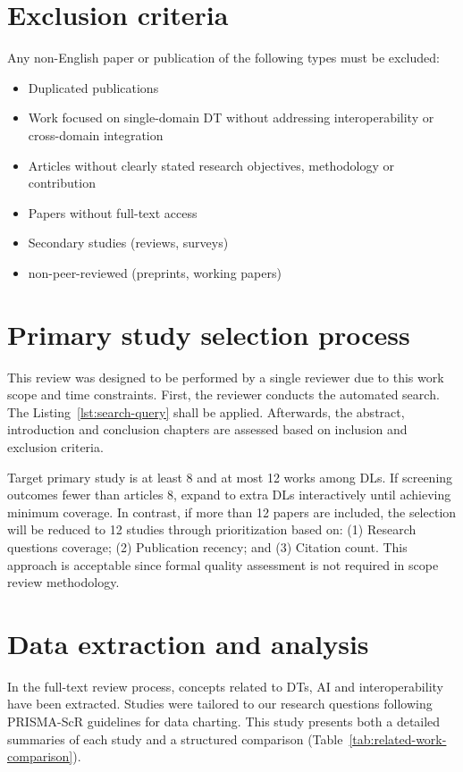 \section{Exclusion criteria}

Any non-English paper or publication of the following types must be excluded:

\begin{itemize}
    \item Duplicated publications
    \item Work focused on single-domain DT without addressing interoperability or cross-domain integration
    \item Articles without clearly stated research objectives, methodology or contribution
    \item Papers without full-text access
    \item Secondary studies (reviews, surveys)
    \item non-peer-reviewed (preprints, working papers)
\end{itemize}

\section{Primary study selection process}

This review was designed to be performed by a single reviewer due to this work scope and time constraints.
First, the reviewer conducts the automated search. The Listing~\ref{lst:search-query} shall be applied.
Afterwards, the abstract, introduction and conclusion chapters are assessed
    based on inclusion and exclusion criteria.

Target primary study is at least 8 and at most 12 works among DLs.
If screening outcomes fewer than articles 8, expand to extra DLs interactively until
    achieving minimum coverage.
In contrast, if more than 12 papers are included,
    the selection will be reduced to 12 studies through prioritization based on:
    (1) Research questions coverage;
    (2) Publication recency; and
    (3) Citation count.
This approach is acceptable since formal quality assessment is not
    required in scope review methodology.

\section{Data extraction and analysis}

In the full-text review process, concepts related to DTs, AI and interoperability have been extracted.
Studies were tailored to our research questions following PRISMA-ScR guidelines for data charting.
This study presents both a detailed summaries of each study and a 
    structured comparison (Table~\ref{tab:related-work-comparison}).

